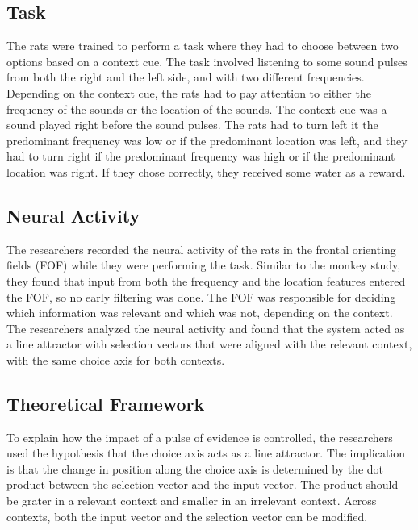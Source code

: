 \documentclass{article}
\begin{document}
\subsection{Task}
The rats were trained to perform a task where they had to choose between two options based on a context cue. The task involved listening to some sound pulses from both the right and the left side, and with two different frequencies. Depending on the context cue, the rats had to pay attention to either the frequency of the sounds or the location of the sounds. The context cue was a sound played right before the sound pulses. The rats had to turn left it the predominant frequency was low or if the predominant location was left, and they had to turn right if the predominant frequency was high or if the predominant location was right. If they chose correctly, they received some water as a reward.

\subsection{Neural Activity}
The researchers recorded the neural activity of the rats in the frontal orienting fields (FOF) while they were performing the task. Similar to the monkey study, they found that input from both the frequency and the location features entered the FOF, so no early filtering was done. The FOF was responsible for deciding which information was relevant and which was not, depending on the context. The researchers analyzed the neural activity and found that the system acted as a line attractor with selection vectors that were aligned with the relevant context, with the same choice axis for both contexts.

\subsection{Theoretical Framework}
To explain how the impact of a pulse of evidence is controlled, the researchers used the hypothesis that the choice axis acts as a line attractor. The implication is that the change in position along the choice axis is determined by the dot product between the selection vector and the input vector. The product should be grater in a relevant context and smaller in an irrelevant context. Across contexts, both the input vector and the selection vector can be modified.
\end{document}
